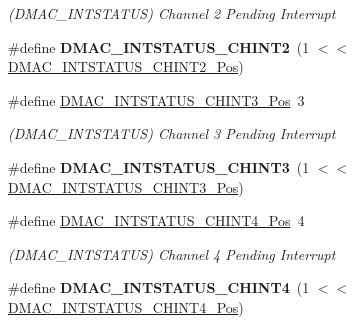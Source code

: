 \begin{DoxyCompactItemize}
\begin{DoxyCompactList}\small\item\em (D\+M\+A\+C\+\_\+\+I\+N\+T\+S\+T\+A\+T\+U\+S) Channel 2 Pending Interrupt \end{DoxyCompactList}\item 
\hypertarget{group___s_a_m_l21___d_m_a_c_ga4c168af785b1ccafac225e54d95ca188}{}\#define {\bfseries D\+M\+A\+C\+\_\+\+I\+N\+T\+S\+T\+A\+T\+U\+S\+\_\+\+C\+H\+I\+N\+T2}~(1 $<$$<$ \hyperlink{group___s_a_m_l21___d_m_a_c_ga6ab2f539c518339e75ad66c6438a8a45}{D\+M\+A\+C\+\_\+\+I\+N\+T\+S\+T\+A\+T\+U\+S\+\_\+\+C\+H\+I\+N\+T2\+\_\+\+Pos})\label{group___s_a_m_l21___d_m_a_c_ga4c168af785b1ccafac225e54d95ca188}

\item 
\hypertarget{group___s_a_m_l21___d_m_a_c_ga38b7f44011acd56ecefb915f5d579f05}{}\#define \hyperlink{group___s_a_m_l21___d_m_a_c_ga38b7f44011acd56ecefb915f5d579f05}{D\+M\+A\+C\+\_\+\+I\+N\+T\+S\+T\+A\+T\+U\+S\+\_\+\+C\+H\+I\+N\+T3\+\_\+\+Pos}~3\label{group___s_a_m_l21___d_m_a_c_ga38b7f44011acd56ecefb915f5d579f05}

\begin{DoxyCompactList}\small\item\em (D\+M\+A\+C\+\_\+\+I\+N\+T\+S\+T\+A\+T\+U\+S) Channel 3 Pending Interrupt \end{DoxyCompactList}\item 
\hypertarget{group___s_a_m_l21___d_m_a_c_gaacaf9cd15dc3b23756e618a89b2b09a0}{}\#define {\bfseries D\+M\+A\+C\+\_\+\+I\+N\+T\+S\+T\+A\+T\+U\+S\+\_\+\+C\+H\+I\+N\+T3}~(1 $<$$<$ \hyperlink{group___s_a_m_l21___d_m_a_c_ga38b7f44011acd56ecefb915f5d579f05}{D\+M\+A\+C\+\_\+\+I\+N\+T\+S\+T\+A\+T\+U\+S\+\_\+\+C\+H\+I\+N\+T3\+\_\+\+Pos})\label{group___s_a_m_l21___d_m_a_c_gaacaf9cd15dc3b23756e618a89b2b09a0}

\item 
\hypertarget{group___s_a_m_l21___d_m_a_c_gab84ae6a55d10faf8560b28ec9bb2ad5e}{}\#define \hyperlink{group___s_a_m_l21___d_m_a_c_gab84ae6a55d10faf8560b28ec9bb2ad5e}{D\+M\+A\+C\+\_\+\+I\+N\+T\+S\+T\+A\+T\+U\+S\+\_\+\+C\+H\+I\+N\+T4\+\_\+\+Pos}~4\label{group___s_a_m_l21___d_m_a_c_gab84ae6a55d10faf8560b28ec9bb2ad5e}

\begin{DoxyCompactList}\small\item\em (D\+M\+A\+C\+\_\+\+I\+N\+T\+S\+T\+A\+T\+U\+S) Channel 4 Pending Interrupt \end{DoxyCompactList}\item 
\hypertarget{group___s_a_m_l21___d_m_a_c_ga7fa8984670b3e6a1b53afe7194af0865}{}\#define {\bfseries D\+M\+A\+C\+\_\+\+I\+N\+T\+S\+T\+A\+T\+U\+S\+\_\+\+C\+H\+I\+N\+T4}~(1 $<$$<$ \hyperlink{group___s_a_m_l21___d_m_a_c_gab84ae6a55d10faf8560b28ec9bb2ad5e}{D\+M\+A\+C\+\_\+\+I\+N\+T\+S\+T\+A\+T\+U\+S\+\_\+\+C\+H\+I\+N\+T4\+\_\+\+Pos})\label{group___s_a_m_l21___d_m_a_c_ga7fa8984670b3e6a1b53afe7194af0865}


\end{DoxyCompactItemize}
